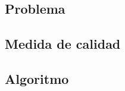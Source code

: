 \documentclass{beamer}
\begin{document}
	\subsection{Problema}
	\subsection{Medida de calidad}
	\subsection{Algoritmo}
	
	
	
	
\end{document}
